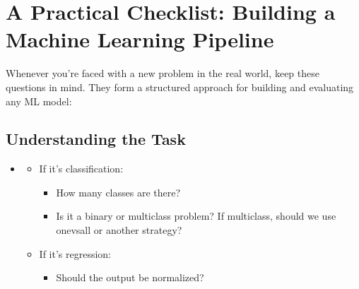 \documentclass[letterpaper,10pt,english]{jupyterBook}
\begin{document}
\section{A Practical Checklist: Building a Machine Learning Pipeline}
\label{\detokenize{conclusion:a-practical-checklist-building-a-machine-learning-pipeline}}
\sphinxAtStartPar
Whenever you’re faced with a new problem in the real world, keep these questions in mind. They form a structured approach for building and evaluating any ML model:


\subsection{Understanding the Task}
\label{\detokenize{conclusion:understanding-the-task}}\begin{itemize}
\item {} 
\sphinxAtStartPar
{}
\begin{itemize}
\item {} 
\sphinxAtStartPar
If it’s classification:
\begin{itemize}
\item {} 
\sphinxAtStartPar
How many classes are there?

\item {} 
\sphinxAtStartPar
Is it a binary or multiclass problem? If multiclass, should we use one\sphinxhyphen{}vs\sphinxhyphen{}all or another strategy?

\end{itemize}

\item {} 
\sphinxAtStartPar
If it’s regression:
\begin{itemize}
\item {} 
\sphinxAtStartPar
Should the output be normalized?

\end{itemize}

\end{itemize}

\end{itemize}
\end{document}

